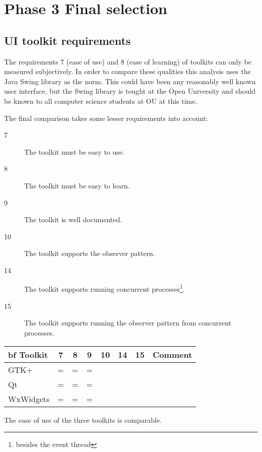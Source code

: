 \section{Phase 3 Final selection}

\subsection{UI toolkit requirements} 

The requirements 7 (ease of use) and 8 (ease of learning) of toolkits can only
be measured subjectively. In order to compare these qualities this analysis
uses the Java Swing library as the norm.  This could have been any reasonably
well known user interface, but the Swing library is tought at the Open
University and should be known to all computer science students at OU at this time.

The final comparison takes some lesser requirements into account:

\begin{description}
	\item[7] The toolkit must be easy to use. 
	\item[8] The toolkit must be easy to learn.
	\item[9] The toolkit is well documented.
	\item[10] The toolkit supports the observer pattern.
	\item[14] The toolkit supports running concurrent processes\footnote{besides the event thread}.
	\item[15] The toolkit supports running the observer pattern
	from concurrent processes.
\end{description}

\begin{center}
	\small\sf
	\begin{tabular}{l|cccc|p{15em}}
		\hline
		{bf Toolkit} & {\bf 7} & {\bf 8} & {\bf 9} & {\bf 10} & {\bf 14} & {\bf 15} & {\bf Comment}\\
		\hline
		GTK+         &   =     &    =    &   =     &          &          &          &  \\
		Qt           &   =     &    =    &   =     &          &          &          &  \\
		WxWidgets    &   =     &    =    &   =     &          &          &          &  \\
		\hline
	\end{tabular}
\end{center}

The ease of use of the three toolkits is comparable. 
